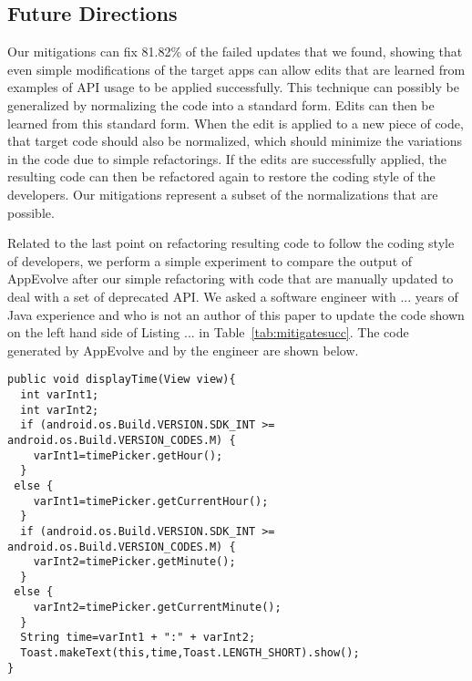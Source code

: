 \subsection{Future Directions}
Our mitigations can fix 81.82\% of the failed updates that we found,
showing that even simple modifications of the target apps can allow
edits that are learned from examples of API usage to be applied
successfully. This technique can possibly be generalized by normalizing the
code into a standard form. Edits can then be learned from this standard
form. When the edit is applied to a new piece of code, that target code
should also be normalized, which should minimize the variations in the code
due to simple refactorings. If the edits are successfully applied, the
resulting code can then be refactored again to restore the coding
style of the developers.  Our mitigations represent a subset of the normalizations that are
possible.

Related to the last point on refactoring resulting code to follow the coding style of developers, we perform a simple experiment to compare the output of AppEvolve after our simple refactoring with code that are manually updated to deal with a set of deprecated API.  We
asked a software engineer with ... years of Java experience and who is not an author of this paper to update the code shown on the left hand side of Listing ... in Table~\ref{tab:mitigatesucc}. The code generated by AppEvolve and by the engineer are shown below.


\vspace{0.2cm}
\begin{lstlisting}[language=text,numbers=none]
public void displayTime(View view){
  int varInt1;
  int varInt2;
  if (android.os.Build.VERSION.SDK_INT >= android.os.Build.VERSION_CODES.M) {
    varInt1=timePicker.getHour();
  }
 else {
    varInt1=timePicker.getCurrentHour();
  }
  if (android.os.Build.VERSION.SDK_INT >= android.os.Build.VERSION_CODES.M) {
    varInt2=timePicker.getMinute();
  }
 else {
    varInt2=timePicker.getCurrentMinute();
  }
  String time=varInt1 + ":" + varInt2;
  Toast.makeText(this,time,Toast.LENGTH_SHORT).show();
}
\end{lstlisting}


